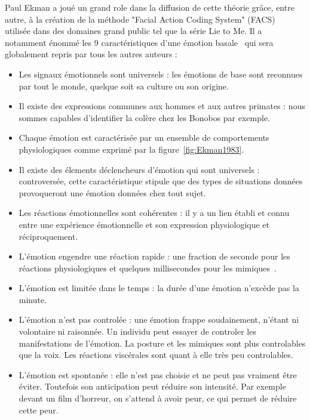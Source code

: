 Paul Ekman a joué un grand role dans la diffusion de cette théorie grâce, entre autre, à la création de la méthode "Facial Action Coding System" (FACS)~\cite{Ekman1978} utilisée dans des domaines grand public tel que la série Lie to Me. Il a notamment énommé les 9 caractéristiques d'une émotion basale~\cite{Ekman1992} qui sera globalement repris par tous les autres auteurs :
\begin{itemize}
  \item Les signaux émotionnels sont universels : les émotions de base sont reconnues par tout le monde, quelque soit sa culture ou son origine.
  \item Il existe des expressions communes aux hommes et aux autres primates : nous sommes capables d'identifier la colère chez les Bonobos par exemple.
  \item Chaque émotion est caractérisée par un ensemble de comportements physiologiques comme exprimé par la figure~\ref{fig:Ekman1983}.
  
  \item Il existe des élements déclencheurs d'émotion qui sont universels : controversée, cette caractéristique stipule que des types de situations données provoqueront une émotion données chez tout sujet.
  \item Les réactions émotionnelles sont cohérentes : il y a un lien établi et connu entre une expérience émotionnelle et son expression physiologique et réciproquement.
  \item L'émotion engendre une réaction rapide : une fraction de seconde pour les réactions physiologiques et quelques millisecondes pour les mimiques~\cite{Ekman1978}.
  \item L'émotion est limitée dans le temps : la durée d'une émotion n'excède pas la minute.
  \item L'émotion n'est pas controlée : une émotion frappe soudainement, n'étant ni volontaire ni raisonnée. Un individu peut essayer de controler les manifestations de l'émotion. La posture et les mimiques sont plus controlables que la voix. Les réactions viscérales sont quant à elle très peu controlables.
  \item L'émotion est spontanée : elle n'est pas choisie et ne peut pas vraiment être éviter. Toutefois son anticipation peut réduire son intensité. Par exemple devant un film d'horreur, on s'attend à avoir peur, ce qui permet de réduire cette peur.
\end{itemize}



